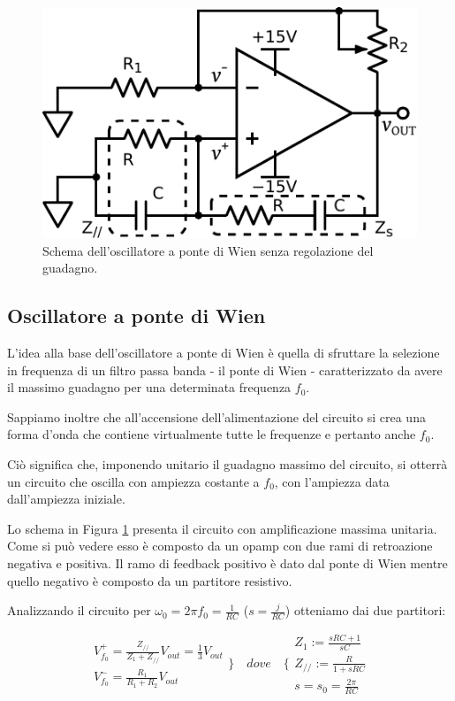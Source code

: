 \begin{figure}
\centering
\includegraphics[width=.35\textwidth]{../E08/latex/osc.pdf}
\caption{Schema dell'oscillatore a ponte di Wien senza regolazione del guadagno.}
\label{cir8:without_lamp}
\end{figure}

\subsection{Oscillatore a ponte di Wien}

L'idea alla base dell'oscillatore a ponte di Wien è quella di sfruttare la selezione in frequenza di un filtro passa banda - il ponte di Wien - caratterizzato da avere il massimo guadagno per una determinata frequenza $f_0$.

Sappiamo inoltre che all'accensione dell'alimentazione del circuito si crea una forma d'onda che contiene virtualmente tutte le frequenze e pertanto anche $f_0$.

Ciò significa che, imponendo unitario il guadagno massimo del circuito, si otterrà un circuito che oscilla con ampiezza costante a $f_0$, con l'ampiezza data dall'ampiezza iniziale.

Lo schema in Figura \ref{cir8:without_lamp} presenta il circuito con amplificazione massima unitaria.
Come si può vedere esso è composto da un opamp con due rami di retroazione negativa e positiva.
Il ramo di feedback positivo è dato dal ponte di Wien mentre quello negativo è composto da un partitore resistivo.

Analizzando il circuito per $\omega_0=2\pi f_0=\frac{1}{RC}$ ($s=\frac{j}{RC}$) otteniamo dai due partitori:

\begin{equation}
  \begin{array}{lr}
	V^+_{f_0} = \frac{Z_{//}}{Z_1 + Z_{//}}V_{out} = \frac{1}{3}V_{out}\\
	V^-_{f_0} = \frac{R_1}{R_1+R_2}V_{out}
  \end{array} \bigg\}
\quad dove \quad %
\Bigg\{
  \begin{array}{lr}
	Z_1 := \frac{sRC+1}{sC}\\
	Z_{//} := \frac{R}{1+sRC}\\
	s = s_0 = \frac{2\pi}{RC}
  \end{array}
\end{equation}

